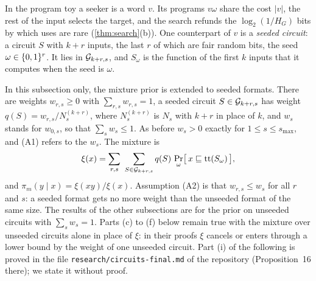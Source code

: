 In the program toy a seeker is a word $v$. Its programs $v\omega$ share the cost $|v|$, the rest of the input
selects the target, and the search refunds the $\log_2(1/H_G)$ bits by which uses are rare
(\cref{thm:search}(b)). One counterpart of $v$ is a \emph{seeded circuit}: a circuit $S$ with $k+r$ inputs,
the last $r$ of which are fair random bits, the seed $\omega\in\{0,1\}^r$. It lies in $\mathcal G_{k+r,s}$, and $S_\omega$
is the function of the first $k$ inputs that it computes when the seed is $\omega$.

In this subsection only, the mixture prior is extended to seeded formats. There are weights $w_{r,s}\ge0$ with
$\sum_{r,s}w_{r,s}=1$, a seeded circuit $S\in\mathcal G_{k+r,s}$ has weight $q(S)=w_{r,s}/N^{(k+r)}_s$, where
$N^{(k+r)}_s$ is $N_s$ with $k+r$ in place of $k$, and $w_s$ stands for $w_{0,s}$, so that $\sum_sw_s\le1$. As
before $w_s>0$ exactly for $1\le s\le s_{\max}$, and (A1) refers to the $w_s$. The mixture is
\[
\xi(x)=\sum_{r,s}\ \sum_{S\in\cG_{k+r,s}}q(S)\,\Pr_\omega\bigl[\,x\pre\ctt(S_\omega)\,\bigr],
\]
and $\pi_m(y\mid x)=\xi(xy)/\xi(x)$. Assumption (A2) is that $w_{r,s}\le w_s$ for all $r$ and $s$: a seeded
format gets no more weight than the unseeded format of the same size. The results of the other subsections are
for the prior on unseeded circuits with $\sum_sw_s=1$. Parts (c) to (f) below remain true with the mixture
over unseeded circuits alone in place of $\xi$: in their proofs $\xi$ cancels or enters through a lower bound
by the weight of one unseeded circuit. Part (i) of the following is proved in the file
\texttt{research/circuits-final.md} of the repository (Proposition~16 there); we state it without proof.

